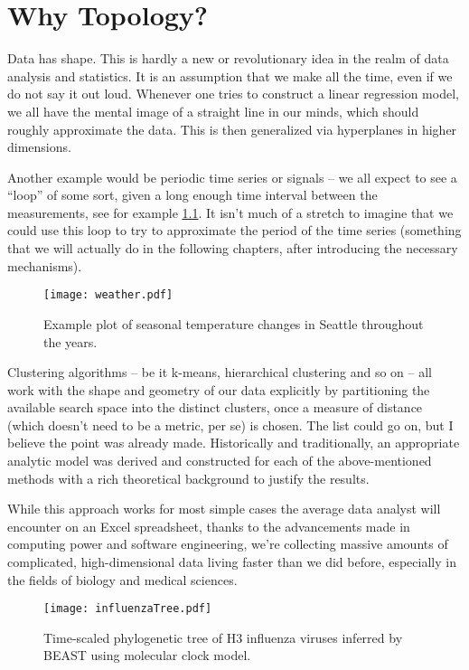 \chapter{Why Topology?}
\graphicspath{ {/home/tomasp/Dokumenty/Master_Thesis/figures/} }

Data has shape. This is hardly a new or revolutionary idea in the realm of data analysis and statistics. It is an assumption that we make all the time, even if we do not say it out loud. Whenever one tries to construct a linear regression model, we all have the mental image of a straight line in our minds, which should roughly approximate the data. This is then generalized via hyperplanes in higher dimensions.
\par
Another example would be periodic time series or signals -- we all expect to see a ``loop'' of some sort, given a long enough time interval between the measurements, see for example \ref{fig:SeattleWeather}. It isn't much of a stretch to imagine that we could use this loop to try to approximate the period of the time series (something that we will actually do in the following chapters, after introducing the necessary mechanisms).

\begin{figure}[h]
  \caption{Example plot of seasonal temperature changes in Seattle throughout the years.}
  \texttt{[image: weather.pdf]}
  \centering
  \label{fig:SeattleWeather}
\end{figure}

Clustering algorithms -- be it k-means, hierarchical clustering and so on -- all work with the shape and geometry of our data explicitly by partitioning the available search space into the distinct clusters, once a measure of distance (which doesn't need to be a metric, per se) is chosen. The list could go on, but I believe the point was already made. Historically and traditionally, an appropriate analytic model was derived and constructed for each of the above-mentioned methods with a rich theoretical background to justify the results.
\par
While this approach works for most simple cases the average data analyst will encounter on an Excel spreadsheet, thanks to the advancements made in computing power and software engineering, we're collecting massive amounts of complicated, high-dimensional data living faster than we did before, especially in the fields of biology and medical sciences.

\begin{figure}[h]
  \caption{Time-scaled phylogenetic tree of H3 influenza viruses inferred by BEAST using molecular clock model.}
  \texttt{[image: influenzaTree.pdf]}
  \centering
  \label{fig:influenzaTree}
\end{figure}

